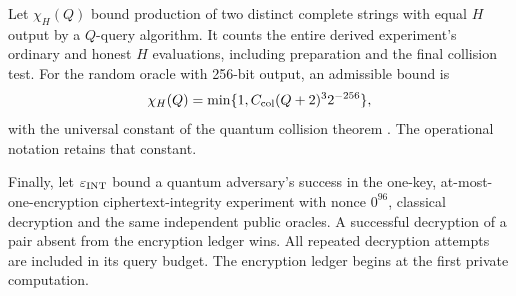 Let $\chi_H(Q)$ bound production of two distinct complete strings with
equal $H$ output by a $Q$-query algorithm. It counts the entire derived
experiment's ordinary and honest $H$ evaluations, including preparation
and the final collision test. For the random oracle with 256-bit output,
an admissible bound is
\[
 \chi_H(Q)=\min\{1,C_{\rm col}(Q+2)^3 2^{-256}\},
\]
with the universal constant of the quantum collision theorem
\cite[Theorem~7]{zhandryCollision2015}. The operational notation retains
that constant.

Finally, let $\varepsilon_{\rm INT}$ bound a quantum adversary's success
in the one-key, at-most-one-encryption ciphertext-integrity experiment
with nonce $0^{96}$, classical decryption and the same independent public
oracles. A successful decryption of a pair absent from the encryption
ledger wins. All repeated decryption attempts are included in its query
budget. The encryption ledger begins at the first private computation.

